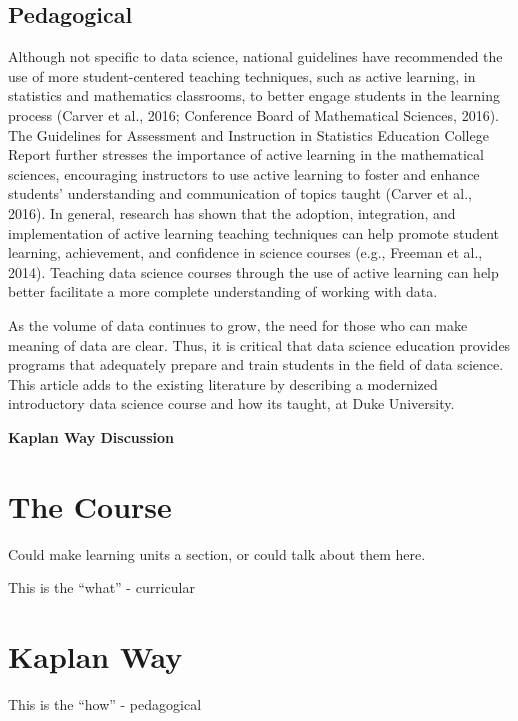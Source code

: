 \documentclass[
  12pt]{article}
\begin{document}
\hypertarget{sec-ped}{%
\subsection{Pedagogical}\label{sec-ped}}

Although not specific to data science, national guidelines have
recommended the use of more student-centered teaching techniques, such
as active learning, in statistics and mathematics classrooms, to better
engage students in the learning process (Carver et al., 2016; Conference
Board of Mathematical Sciences, 2016). The Guidelines for Assessment and
Instruction in Statistics Education College Report further stresses the
importance of active learning in the mathematical sciences, encouraging
instructors to use active learning to foster and enhance students'
understanding and communication of topics taught (Carver et al., 2016).
In general, research has shown that the adoption, integration, and
implementation of active learning teaching techniques can help promote
student learning, achievement, and confidence in science courses (e.g.,
Freeman et al., 2014). Teaching data science courses through the use of
active learning can help better facilitate a more complete understanding
of working with data.

As the volume of data continues to grow, the need for those who can make
meaning of data are clear. Thus, it is critical that data science
education provides programs that adequately prepare and train students
in the field of data science. This article adds to the existing
literature by describing a modernized introductory data science course
and how its taught, at Duke University.

\textbf{Kaplan Way Discussion}

\hypertarget{the-course}{%
\section{The Course}\label{the-course}}

Could make learning units a section, or could talk about them here.

This is the ``what'' - curricular

\hypertarget{kaplan-way}{%
\section{Kaplan Way}\label{kaplan-way}}

This is the ``how'' - pedagogical
\end{document}
